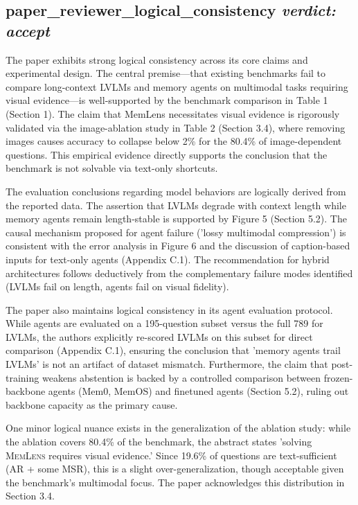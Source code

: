 \documentclass{llmxive}
\providecommand{\bench}{\textsc{MemLens}}
\begin{document}
\bigskip

\subsection*{paper\_reviewer\_logical\_consistency \hfill \textit{verdict: accept}}
The paper exhibits strong logical consistency across its core claims and experimental design. The central premise—that existing benchmarks fail to compare long-context LVLMs and memory agents on multimodal tasks requiring visual evidence—is well-supported by the benchmark comparison in Table 1 (Section 1). The claim that MemLens necessitates visual evidence is rigorously validated via the image-ablation study in Table 2 (Section 3.4), where removing images causes accuracy to collapse below 2\% for the 80.4\% of image-dependent questions. This empirical evidence directly supports the conclusion that the benchmark is not solvable via text-only shortcuts.

The evaluation conclusions regarding model behaviors are logically derived from the reported data. The assertion that LVLMs degrade with context length while memory agents remain length-stable is supported by Figure 5 (Section 5.2). The causal mechanism proposed for agent failure ('lossy multimodal compression') is consistent with the error analysis in Figure 6 and the discussion of caption-based inputs for text-only agents (Appendix C.1). The recommendation for hybrid architectures follows deductively from the complementary failure modes identified (LVLMs fail on length, agents fail on visual fidelity).

The paper also maintains logical consistency in its agent evaluation protocol. While agents are evaluated on a 195-question subset versus the full 789 for LVLMs, the authors explicitly re-scored LVLMs on this subset for direct comparison (Appendix C.1), ensuring the conclusion that 'memory agents trail LVLMs' is not an artifact of dataset mismatch. Furthermore, the claim that post-training weakens abstention is backed by a controlled comparison between frozen-backbone agents (Mem0, MemOS) and finetuned agents (Section 5.2), ruling out backbone capacity as the primary cause.

One minor logical nuance exists in the generalization of the ablation study: while the ablation covers 80.4\% of the benchmark, the abstract states 'solving \bench{} requires visual evidence.' Since 19.6\% of questions are text-sufficient (AR + some MSR), this is a slight over-generalization, though acceptable given the benchmark's multimodal focus. The paper acknowledges this distribution in Section 3.4.
\end{document}
